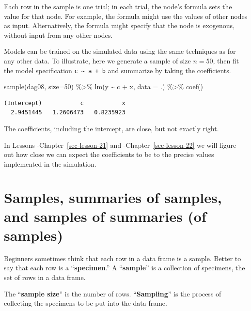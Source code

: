 \documentclass[
  letterpaper,
  DIV=11,
  numbers=noendperiod,
  oneside]{scrreprt}
\newenvironment{Shaded}{\begin{snugshade}}{\end{snugshade}}
\newcommand{\AttributeTok}[1]{\textcolor[rgb]{0.40,0.45,0.13}{#1}}
\newcommand{\DecValTok}[1]{\textcolor[rgb]{0.68,0.00,0.00}{#1}}
\newcommand{\FunctionTok}[1]{\textcolor[rgb]{0.28,0.35,0.67}{#1}}
\newcommand{\NormalTok}[1]{\textcolor[rgb]{0.00,0.23,0.31}{#1}}
\newcommand{\SpecialCharTok}[1]{\textcolor[rgb]{0.37,0.37,0.37}{#1}}
\begin{document}
Each row in the sample is one trial; in each trial, the node's formula
sets the value for that node. For example, the formula might use the
values of other nodes as input. Alternatively, the formula might specify
that the node is exogenous, without input from any other nodes.

Models can be trained on the simulated data using the same techniques as
for any other data. To illustrate, here we generate a sample of size
\(n=50\), then fit the model specification
\texttt{c\ \textasciitilde{}\ a\ +\ b} and summarize by taking the
coefficients.

\begin{Shaded}
\begin{Highlighting}[]
\FunctionTok{sample}\NormalTok{(dag08, }\AttributeTok{size=}\DecValTok{50}\NormalTok{) }\SpecialCharTok{\%\textgreater{}\%} 
  \FunctionTok{lm}\NormalTok{(y }\SpecialCharTok{\textasciitilde{}}\NormalTok{ c }\SpecialCharTok{+}\NormalTok{ x, }\AttributeTok{data =}\NormalTok{ .) }\SpecialCharTok{\%\textgreater{}\%}
  \FunctionTok{coef}\NormalTok{()}
\end{Highlighting}
\end{Shaded}

\begin{verbatim}
(Intercept)           c           x 
  2.9451445   1.2606473   0.8235923 
\end{verbatim}

The coefficients, including the intercept, are close, but not exactly
right.

In Lessons -Chapter~\ref{sec-lesson-21} and -Chapter~\ref{sec-lesson-22}
we will figure out how close we can expect the coefficients to be to the
precise values implemented in the simulation.

\hypertarget{samples-summaries-of-samples-and-samples-of-summaries-of-samples}{%
\section{Samples, summaries of samples, and samples of summaries (of
samples)}\label{samples-summaries-of-samples-and-samples-of-summaries-of-samples}}

Beginners sometimes think that each row in a data frame is a sample.
Better to say that each row is a ``\textbf{specimen}.'' A
``\textbf{sample}'' is a collection of specimens, the set of rows in a
data frame.

The ``\textbf{sample size}'' is the number of rows.
``\textbf{Sampling}'' is the process of collecting the specimens to be
put into the data frame.
\end{document}
